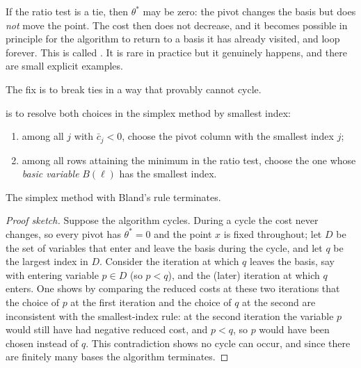 \begin{center}
\end{center}

If the ratio test is a tie, then $\theta^*$ may be zero: the pivot changes the basis but does \emph{not} move the point. The cost then does not decrease, and it becomes possible in principle for the algorithm to return to a basis it has already visited, and loop forever. This is called . It is rare in practice but it genuinely happens, and there are small explicit examples.

The fix is to break ties in a way that provably cannot cycle.

\begin{definition}
     is to resolve both choices in the simplex method by smallest index:
    \begin{enumerate}[label=(\roman*)]
        \item among all $j$ with $\bar c_j < 0$, choose the pivot column with the smallest index $j$;
        \item among all rows attaining the minimum in the ratio test, choose the one whose \emph{basic variable} $B(\ell)$ has the smallest index.
    \end{enumerate}
\end{definition}

\begin{theorem}[Bland]
    The simplex method with Bland's rule terminates.
\end{theorem}
\begin{proof}[Proof sketch]
    Suppose the algorithm cycles. During a cycle the cost never changes, so every pivot has $\theta^* = 0$ and the point $x$ is fixed throughout; let $D$ be the set of variables that enter and leave the basis during the cycle, and let $q$ be the largest index in $D$. Consider the iteration at which $q$ leaves the basis, say with entering variable $p \in D$ (so $p < q$), and the (later) iteration at which $q$ enters. One shows by comparing the reduced costs at these two iterations that the choice of $p$ at the first iteration and the choice of $q$ at the second are inconsistent with the smallest-index rule: at the second iteration the variable $p$ would still have had negative reduced cost, and $p < q$, so $p$ would have been chosen instead of $q$. This contradiction shows no cycle can occur, and since there are finitely many bases the algorithm terminates.
\end{proof}

